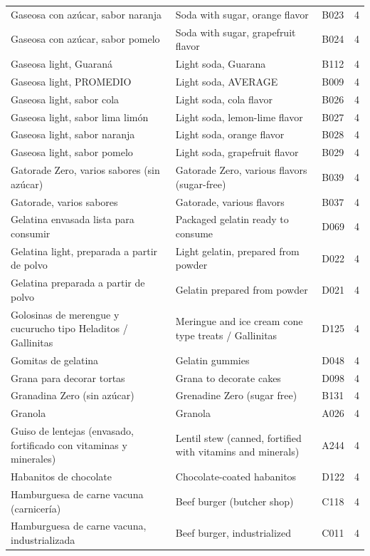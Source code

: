 {\begin{longtable}{p{4.3cm}p{5.5cm}p{1.5cm}p{0.7cm}}
Gaseosa con azúcar, sabor naranja & Soda with sugar, orange flavor & B023 & 4\\
Gaseosa con azúcar, sabor pomelo & Soda with sugar, grapefruit flavor & B024 & 4\\
Gaseosa light, Guaraná & Light soda, Guarana & B112 & 4\\
Gaseosa light, PROMEDIO & Light soda, AVERAGE & B009 & 4\\
Gaseosa light, sabor cola & Light soda, cola flavor & B026 & 4\\
Gaseosa light, sabor lima limón & Light soda, lemon-lime flavor & B027 & 4\\
Gaseosa light, sabor naranja & Light soda, orange flavor & B028 & 4\\
Gaseosa light, sabor pomelo & Light soda, grapefruit flavor & B029 & 4\\
Gatorade Zero, varios sabores (sin azúcar) & Gatorade Zero, various flavors (sugar-free) & B039 & 4\\
Gatorade, varios sabores & Gatorade, various flavors & B037 & 4\\
Gelatina envasada lista para consumir & Packaged gelatin ready to consume & D069 & 4\\
Gelatina light, preparada a partir de polvo & Light gelatin, prepared from powder & D022 & 4\\
Gelatina preparada a partir de polvo & Gelatin prepared from powder & D021 & 4\\
Golosinas de merengue y cucurucho tipo Heladitos / Gallinitas & Meringue and ice cream cone type treats / Gallinitas & D125 & 4\\
Gomitas de gelatina & Gelatin gummies & D048 & 4\\
Grana para decorar tortas & Grana to decorate cakes & D098 & 4\\
Granadina Zero (sin azúcar) & Grenadine Zero (sugar free) & B131 & 4\\
Granola & Granola & A026 & 4\\
Guiso de lentejas (envasado, fortificado con vitaminas y minerales) & Lentil stew (canned, fortified with vitamins and minerals) & A244 & 4\\
Habanitos de chocolate & Chocolate-coated habanitos & D122 & 4\\
Hamburguesa de carne vacuna (carnicería) & Beef burger (butcher shop) & C118 & 4\\
Hamburguesa de carne vacuna, industrializada & Beef burger, industrialized & C011 & 4\\

\end{longtable}}
